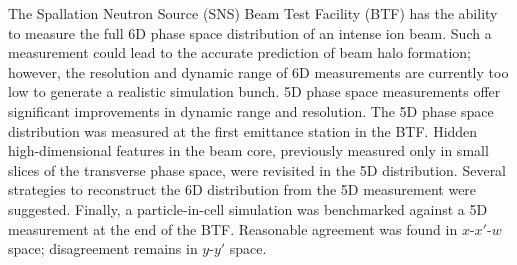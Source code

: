 \documentclass[letterpaper,
               nospread,
               biblatex,
              ]{jacow}
\begin{document}
The Spallation Neutron Source (SNS) Beam Test Facility (BTF) has the ability to measure the full 6D phase space distribution of an intense ion beam. Such a measurement could lead to the accurate prediction of beam halo formation; however, the resolution and dynamic range of 6D measurements are currently too low to generate a realistic simulation bunch. 5D phase space measurements offer significant improvements in dynamic range and resolution. The 5D phase space distribution was measured at the first emittance station in the BTF. Hidden high-dimensional features in the beam core, previously measured only in small slices of the transverse phase space, were revisited in the 5D distribution. Several strategies to reconstruct the 6D distribution from the 5D measurement were suggested. Finally, a particle-in-cell simulation was benchmarked against a 5D measurement at the end of the BTF. Reasonable agreement was found in $x$-$x'$-$w$ space; disagreement remains in $y$-$y'$ space. 


\printbibliography
\end{document}
